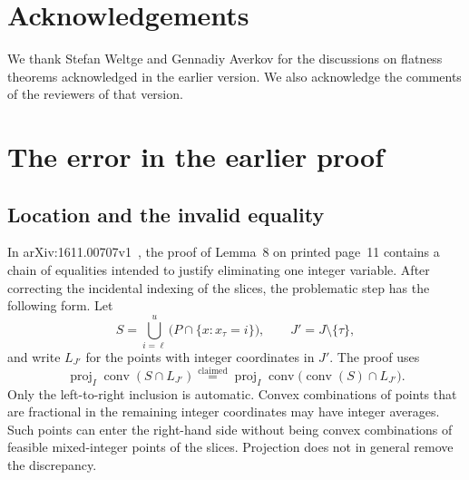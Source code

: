\documentclass[11pt]{article}
\theoremstyle{definition}
\DeclareMathOperator{\conv}{conv}
\DeclareMathOperator{\proj}{proj}
\begin{document}
\section*{Acknowledgements}
We thank Stefan Weltge and Gennadiy Averkov for the discussions on flatness
theorems acknowledged in the earlier version. We also acknowledge the
comments of the reviewers of that version.

\appendix
\section{The error in the earlier proof}\label{app:error}

\subsection{Location and the invalid equality}
In arXiv:1611.00707v1~\cite{HWZ2016}, the proof of Lemma~8 on printed
page~11 contains a chain of equalities intended to justify eliminating one
integer variable. After correcting the incidental indexing of the slices,
the problematic step has the following form. Let
\[
 S=\bigcup_{i=\ell}^{u}\bigl(P\cap\{x:x_\tau=i\}\bigr),
 \qquad J'=J\setminus\{\tau\},
\]
and write $L_{J'}$ for the points with integer coordinates in $J'$. The proof
uses
\begin{equation}\label{eq:false}
 \proj_I\conv(S\cap L_{J'})
 \stackrel{\text{claimed}}{=}
 \proj_I\conv\bigl(\conv(S)\cap L_{J'}\bigr).
\end{equation}
Only the left-to-right inclusion is automatic. Convex combinations of points
that are fractional in the remaining integer coordinates may have integer
averages. Such points can enter the right-hand side without being convex
combinations of feasible mixed-integer points of the slices. Projection does
not in general remove the discrepancy.
\end{document}

